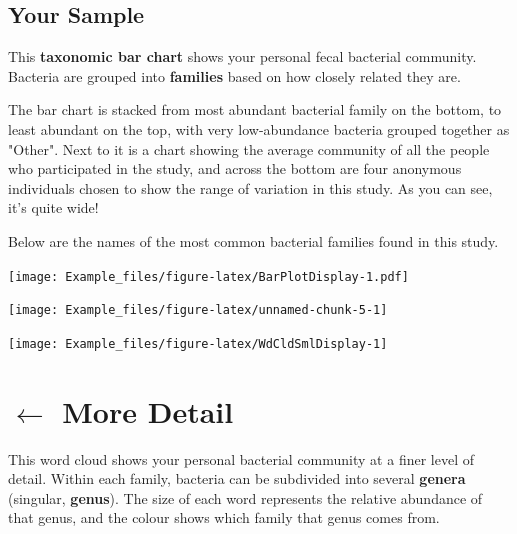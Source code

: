 \documentclass[
]{article}
\begin{document}
\newpage

\vspace*{\fill}

\begin{multicols}{2}

\section{Your Sample}
\begin{small}
This \textbf{taxonomic bar chart} shows your personal fecal bacterial community. 
Bacteria are grouped into \textbf{families} based on how closely related
they are.

The bar chart is stacked from most abundant bacterial family on the 
bottom, to least abundant on the top, with very low-abundance 
bacteria grouped together as "Other". Next to it is a chart showing
the average community of all the people who participated in the study,
and across the bottom are four anonymous individuals chosen to show
the range of variation in this study. As you can see, it's quite wide!

Below are the names of the most common bacterial families found in this study.
\end{small}
\columnbreak

\texttt{[image: Example\_files/figure-latex/BarPlotDisplay-1.pdf]}

\end{multicols}

\begin{center}\texttt{[image: Example\_files/figure-latex/unnamed-chunk-5-1]} \end{center}
\vspace*{\fill}
\newpage

\begin{multicols}{2}
\raggedcolumns

\begin{center}\texttt{[image: Example\_files/figure-latex/WdCldSmlDisplay-1]} \end{center}

\columnbreak

\vspace*{1cm}
\section{$\boldsymbol{\leftarrow}$ More Detail}
\begin{small}
This word cloud shows your personal bacterial community at a finer 
level of detail. Within each family, bacteria can be subdivided into 
several \textbf{genera} (singular, \textbf{genus}). The size of each word
represents the relative abundance of that genus, and the colour shows
which family that genus comes from.
\end{small}
\vspace*{\fill}

\end{multicols}
\end{document}
